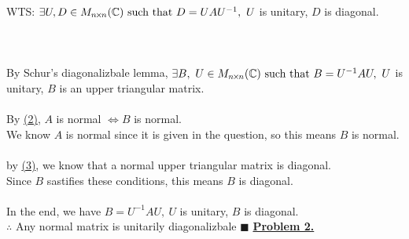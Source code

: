 \documentclass[12pt]{article}
\newcommand{\timesSmall}{{\mkern-2mu\times\mkern-2mu}}
\newcommand{\C}{\mathbb{C}}
\renewcommand{\qed}{\hfill$\blacksquare$}
\begin{document}
WTS: $\exists U,D \in M_{n\timesSmall n}(\C) \text{ such that } D = UAU^{-1},\ U$ is unitary, $D$ is diagonal. 
\\\\
\\\\
By Schur's diagonalizbale lemma, $\exists B,\ U \in M_{n\timesSmall n}(\C) \text{ such that }\\ B = U^{-1}AU,\ U$ is unitary, $B$ is an upper triangular matrix.
\\\\
By \hyperlink{1.2}{(2)}, $A$ is normal $\iff B$ is normal.\\
We know $A$ is normal since it is given in the question, so this means $B$ is normal.
\\\\
by \hyperlink{1.3}{(3)}, we know that a normal upper triangular matrix is diagonal.\\
Since $B$ sastifies these conditions, this means $B$ is diagonal.
\\\\
In the end, we have $B = U^{-1}AU,\ U$ is unitary, $B$ is diagonal. \\
$\therefore $ Any normal matrix is unitarily diagonalizbale \qed
\newpage
{\LARGE \noindent \underline{\textbf{Problem 2.}}}\\
\end{document}
